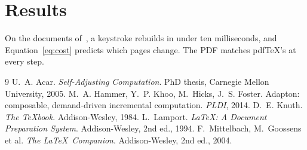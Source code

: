 \documentclass[11pt]{article}
\begin{document}
\section{Results}\label{sec:results}

On the documents of~\cite{lamport1994,mittelbach2004}, a keystroke rebuilds
in under ten milliseconds, and Equation~\eqref{eq:cost} predicts which pages
change. The PDF matches pdf\TeX's at every step.

\begin{thebibliography}{9}
 U.~A. Acar. \emph{Self-Adjusting Computation}. PhD thesis, Carnegie Mellon University, 2005.
 M.~A. Hammer, Y.~P. Khoo, M.~Hicks, J.~S. Foster. Adapton: composable, demand-driven incremental computation. \emph{PLDI}, 2014.
 D.~E. Knuth. \emph{The \TeX book}. Addison-Wesley, 1984.
 L.~Lamport. \emph{\LaTeX: A Document Preparation System}. Addison-Wesley, 2nd ed., 1994.
 F.~Mittelbach, M.~Goossens et al. \emph{The \LaTeX\ Companion}. Addison-Wesley, 2nd ed., 2004.
\end{thebibliography}
\end{document}
